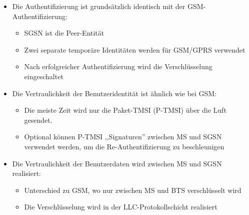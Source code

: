 \documentclass[a4paper]{article}
\begin{document}
\begin{multicols}{3}
\begin{itemize}
              \begin{itemize}
                  \item
                        Die Authentifizierung ist grundsätzlich identisch mit der
                        GSM-Authentifizierung:

                        \begin{itemize}
                            \item
                                  SGSN ist die Peer-Entität
                            \item
                                  Zwei separate temporäre Identitäten werden für GSM/GPRS verwendet
                            \item
                                  Nach erfolgreicher Authentifizierung wird die Verschlüsselung
                                  eingeschaltet
                        \end{itemize}
                  \item
                        Die Vertraulichkeit der Benutzeridentität ist ähnlich wie bei GSM:

                        \begin{itemize}
                            \item
                                  Die meiste Zeit wird nur die Paket-TMSI (P-TMSI) über die Luft
                                  gesendet.
                            \item
                                  Optional können P-TMSI ,,Signaturen'' zwischen MS und SGSN
                                  verwendet werden, um die Re-Authentifizierung zu beschleunigen
                        \end{itemize}
                  \item
                        Die Vertraulichkeit der Benutzerdaten wird zwischen MS und SGSN
                        realisiert:

                        \begin{itemize}
                            \item
                                  Unterschied zu GSM, wo nur zwischen MS und BTS verschlüsselt wird
                            \item
                                  Die Verschlüsselung wird in der LLC-Protokollschicht realisiert
                        \end{itemize}
              \end{itemize}
    \end{itemize}


\end{multicols}
\end{document}
